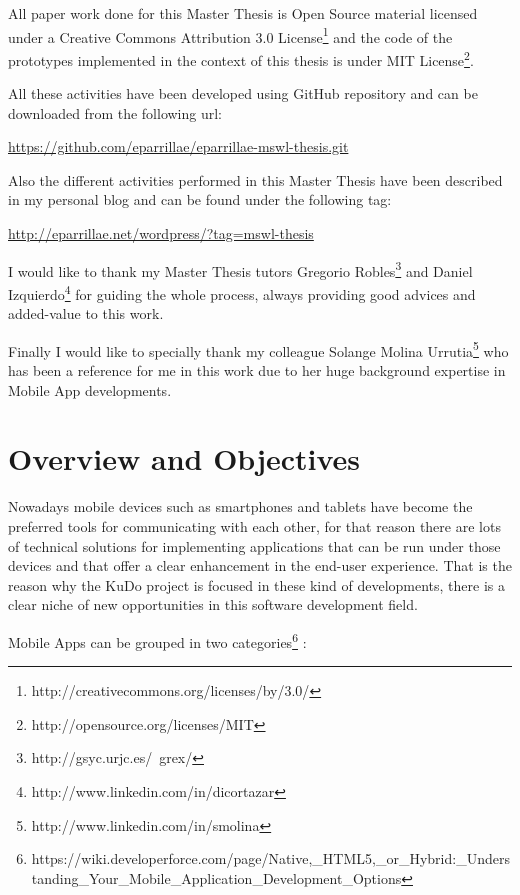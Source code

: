 \documentclass[a4paper,12pt]{book}
\begin{document}
All paper work done for this Master Thesis is Open Source material licensed under a Creative Commons Attribution 3.0 License\footnote{http://creativecommons.org/licenses/by/3.0/} and the code of the prototypes implemented in the context of this thesis is under MIT License\footnote{http://opensource.org/licenses/MIT}.

All these activities have been developed using GitHub repository and can be downloaded from the following url:

\url{
https://github.com/eparrillae/eparrillae-mswl-thesis.git}

Also the different activities performed in this Master Thesis have been described in my personal blog and can be found under the following tag:

\url{
http://eparrillae.net/wordpress/?tag=mswl-thesis}

I would like to thank my Master Thesis tutors Gregorio Robles\footnote{http://gsyc.urjc.es/~grex/} and Daniel Izquierdo\footnote{http://www.linkedin.com/in/dicortazar} for guiding the whole process, always providing good advices and added-value to this work.

Finally I would like to specially thank my colleague Solange Molina Urrutia\footnote{http://www.linkedin.com/in/smolina} who has been a reference for me in this work due to her huge background expertise in Mobile App developments.  


\chapter{Overview and Objectives}
\label{chap:overview}

Nowadays mobile devices such as smartphones and tablets have become the preferred tools for communicating with each other, for that reason there are lots of technical solutions for implementing applications that can be run under those devices and that offer a clear enhancement in the end-user experience. That is the reason why the KuDo project is focused in these kind of developments, there is a clear niche of new opportunities in this software development field.

Mobile Apps can be grouped in two categories\footnote{https://wiki.developerforce.com/page/Native,\_HTML5,\_or\_Hybrid:\_Understanding\_Your\_Mobile\_Application\_Development\_Options} :
\end{document}
